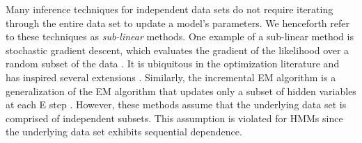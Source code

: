 Many inference techniques for independent data sets do not require iterating through the entire data set to update a model's parameters. We henceforth refer to these techniques as \textit{sub-linear} methods. %
%
One example of a sub-linear method is stochastic gradient descent, which %
evaluates the gradient of the likelihood over a random subset of the data \citep{Robbins:1951}. It is ubiquitous in the optimization literature and has inspired several extensions \citep{Johnson:2013, Defazio:2014, Kingma:2014}. %
%
Similarly, the incremental EM algorithm is a generalization of the EM algorithm %
that updates only a subset of hidden variables at each E step \citep{Neal:1998, Thiesson:2001, Karimi:2019}. %
%
%
However, these methods assume that the underlying data set is comprised of independent subsets. This assumption is violated for HMMs since the underlying data set exhibits sequential dependence. 


